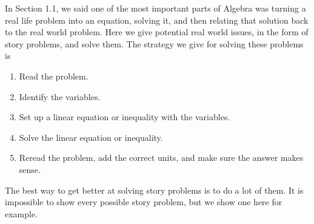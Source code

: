 \documentclass{book}
\theoremstyle{definition}
\begin{document}
In Section 1.1, we said one of the most important parts of Algebra was turning a real life problem into an equation, solving it, and then relating that solution back to the real world problem. Here we give potential real world issues, in the form of story problems, and solve them.
The strategy we give for solving these problems is

\begin{enumerate}
    \item Read the problem.
    \item Identify the variables.
    \item Set up a linear equation or inequality with the variables.
    \item Solve the linear equation or inequality.
    \item Reread the problem, add the correct units, and make sure the answer makes sense.
\end{enumerate}

The best way to get better at solving story problems is to do a lot of them. It is impossible to show every possible story problem, but we show one here for example.
\end{document}
